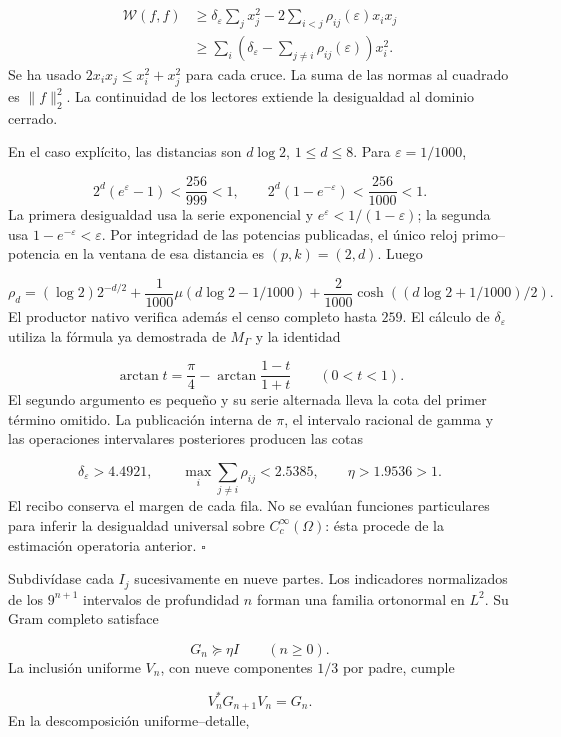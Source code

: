 \[
\begin{aligned}
\mathscr W(f,f)&\geq
\delta_\varepsilon\sum_jx_j^2
-2\sum_{i<j}\rho_{ij}(\varepsilon)x_ix_j\\
&\geq\sum_i\left(\delta_\varepsilon-
\sum_{j\neq i}\rho_{ij}(\varepsilon)\right)x_i^2.
\end{aligned}
\]
Se ha usado \(2x_ix_j\leq x_i^2+x_j^2\) para cada cruce. La suma de las normas al cuadrado es \(\|f\|_2^2\). La continuidad de los lectores extiende la desigualdad al dominio cerrado.

En el caso explícito, las distancias son \(d\log2\), \(1\leq d\leq8\). Para \(\varepsilon=1/1000\),

\[
2^d(e^\varepsilon-1)<\frac{256}{999}<1,
\qquad 2^d(1-e^{-\varepsilon})<\frac{256}{1000}<1.
\]
La primera desigualdad usa la serie exponencial y \(e^\varepsilon<1/(1-\varepsilon)\); la segunda usa \(1-e^{-\varepsilon}<\varepsilon\). Por integridad de las potencias publicadas, el único reloj primo–potencia en la ventana de esa distancia es \((p,k)=(2,d)\). Luego

\[
\rho_d=(\log2)2^{-d/2}
+\frac1{1000}\mu(d\log2-1/1000)
+\frac2{1000}\cosh((d\log2+1/1000)/2).
\]
El productor nativo verifica además el censo completo hasta \(259\). El cálculo de \(\delta_\varepsilon\) utiliza la fórmula ya demostrada de \(M_\Gamma\) y la identidad

\[
\arctan t=\frac\pi4-
\arctan\frac{1-t}{1+t}\qquad(0<t<1).
\]
El segundo argumento es pequeño y su serie alternada lleva la cota del primer término omitido. La publicación interna de \(\pi\), el intervalo racional de gamma y las operaciones intervalares posteriores producen las cotas

\[
\delta_\varepsilon>4.4921,\qquad
\max_i\sum_{j\neq i}\rho_{ij}<2.5385,\qquad
\eta>1.9536>1.
\]
El recibo conserva el margen de cada fila. No se evalúan funciones particulares para inferir la desigualdad universal sobre \(C_c^\infty(\Omega)\): ésta procede de la estimación operatoria anterior. \hfill\(\square\)

Subdivídase cada \(I_j\) sucesivamente en nueve partes. Los indicadores normalizados de los \(9^{n+1}\) intervalos de profundidad \(n\) forman una familia ortonormal en \(L^2\). Su Gram completo satisface

\[
G_n\succeq\eta I\qquad(n\geq0).
\]
La inclusión uniforme \(V_n\), con nueve componentes \(1/3\) por padre, cumple

\[
V_n^*G_{n+1}V_n=G_n.
\]
En la descomposición uniforme–detalle,

